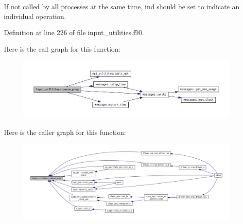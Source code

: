 If not called by all processes at the same time, {\ttfamily ind} should be set to indicate an individual operation. 

Definition at line 226 of file input\+\_\+utilities.\+f90.

Here is the call graph for this function\+:
\nopagebreak
\begin{figure}[H]
\begin{center}
\leavevmode
\includegraphics[width=350pt]{namespaceinput__utilities_a71bd36f063d55ab62c7a37864aef1185_cgraph}
\end{center}
\end{figure}
Here is the caller graph for this function\+:
\nopagebreak
\begin{figure}[H]
\begin{center}
\leavevmode
\includegraphics[width=350pt]{namespaceinput__utilities_a71bd36f063d55ab62c7a37864aef1185_icgraph}
\end{center}
\end{figure}

